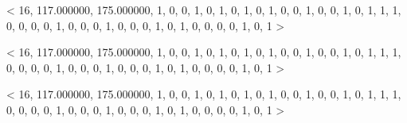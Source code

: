 < 16, 117.000000, 175.000000, 1, 0, 0, 1, 0, 1, 0, 1, 0, 1, 0, 0, 1, 0, 0, 1, 0, 1, 1, 1, 0, 0, 0, 0, 1, 0, 0, 0, 1, 0, 0, 0, 1, 0, 1, 0, 0, 0, 0, 1, 0, 1 > 

< 16, 117.000000, 175.000000, 1, 0, 0, 1, 0, 1, 0, 1, 0, 1, 0, 0, 1, 0, 0, 1, 0, 1, 1, 1, 0, 0, 0, 0, 1, 0, 0, 0, 1, 0, 0, 0, 1, 0, 1, 0, 0, 0, 0, 1, 0, 1 > 

< 16, 117.000000, 175.000000, 1, 0, 0, 1, 0, 1, 0, 1, 0, 1, 0, 0, 1, 0, 0, 1, 0, 1, 1, 1, 0, 0, 0, 0, 1, 0, 0, 0, 1, 0, 0, 0, 1, 0, 1, 0, 0, 0, 0, 1, 0, 1 > 